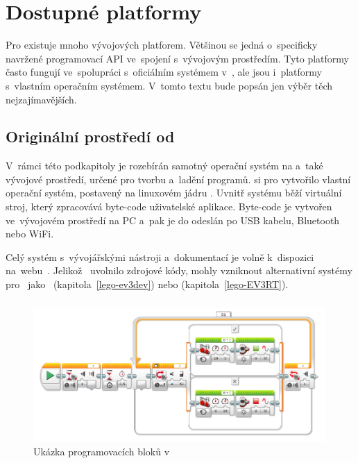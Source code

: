 \chapter{Dostupné platformy}

\label{lego-soft-available-platforms}


Pro \legoEV{} existuje mnoho vývojových platforem. 
Většinou se jedná o~specificky navržené programovací API ve~spojení s~vývojovým prostředím. 
Tyto platformy často fungují ve~spolupráci s~oficiálním systémem v~\EVthree{}, ale jsou i~platformy s~vlastním operačním systémem. 
V~tomto textu bude popsán jen výběr těch nejzajímavějších. %

\section{Originální prostředí od \lego}

V~rámci této podkapitoly je rozebírán samotný operační systém na \EVthree{} a~také vývojové prostředí, určené pro tvorbu a~ladění programů. 
\lego{} si pro \EVthree{} vytvořilo vlastní operační systém, postavený na linuxovém jádru \cite{legoMindstormsEV3_fw-dev-kit}. 
Uvnitř systému běží virtuální stroj, který zpracovává byte-code uživatelské aplikace. 
Byte-code je vytvořen ve~vývojovém prostředí na PC a~pak je do  odeslán po USB kabelu, Bluetooth nebo WiFi.

Celý systém s~vývojářskými nástroji a~dokumentací je volně k~dispozici na~webu~\cite{legoMindstorms_download}. Jelikož~\lego{} uvolnilo zdrojové kódy, mohly vzniknout alternativní systémy pro~\EVthree{} jako~\evThreeDev{} (kapitola~\ref{lego-ev3dev}) nebo \evRT{} (kapitola~\ref{lego-EV3RT}). 

\subsection{\legoSW{}}
\label{lego-soft-orig-problems}


\begin{figure}[h]
	\centering
	\includegraphics[width=0.99\textwidth]{images/lego-soft_robotut_switch-touch+motors+leds.png}
	\caption{Ukázka programovacích bloků v~\legoSW}
	\label{fig:lego-soft_example-blocks}
\end{figure}

